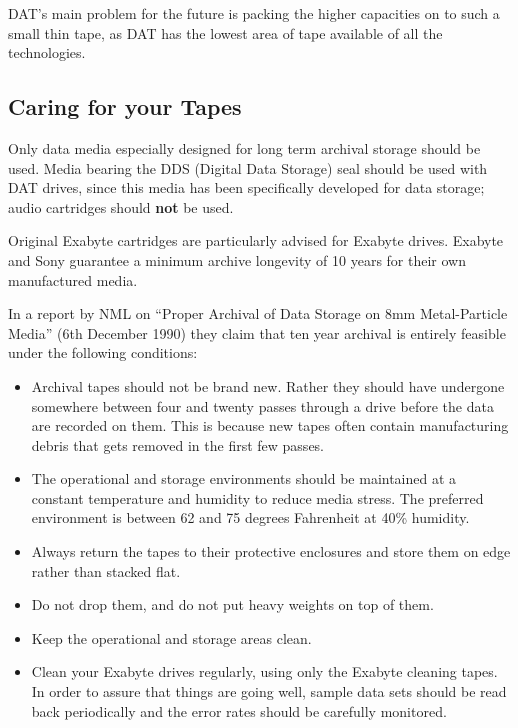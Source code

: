 \documentclass[11pt]{article}
\begin{document}
DAT's main problem for the future is packing the higher capacities on to
such a small thin tape, as DAT has the lowest area of tape available of all
the technologies.

\subsection {Caring for your Tapes}

Only data media especially designed for long term archival storage should be
used. Media bearing the DDS (Digital Data Storage) seal should be used with DAT
drives, since this media has been specifically developed for data storage;
audio cartridges should {\bf not} be used.

Original Exabyte cartridges are particularly advised for Exabyte drives.
Exabyte and Sony guarantee a minimum archive longevity of 10 years for their
own manufactured media.

In a report by NML on ``Proper Archival of Data Storage on 8mm Metal-Particle
Media'' (6th December 1990) they claim that ten year archival is entirely
feasible under the following conditions:

\begin {itemize}

\item Archival tapes should not be brand new. Rather they should have
undergone somewhere between four and twenty passes through a drive before
the data are recorded on them. This is because new tapes often contain
manufacturing debris that gets removed in the first few passes.

\item The operational and storage environments should be maintained at a
constant temperature and humidity to reduce media stress. The preferred
environment is between 62 and 75 degrees Fahrenheit at 40\% humidity.

\item Always return the tapes to their protective enclosures and store them
on edge rather than stacked flat.

\item Do not drop them, and do not put heavy weights on top of them.

\item Keep the operational and storage areas clean.

\item Clean your Exabyte drives regularly, using only the Exabyte cleaning
tapes. In order to assure that things are going well, sample data sets
should be read back periodically and the error rates should be carefully
monitored.

\end {itemize}
\end{document}
